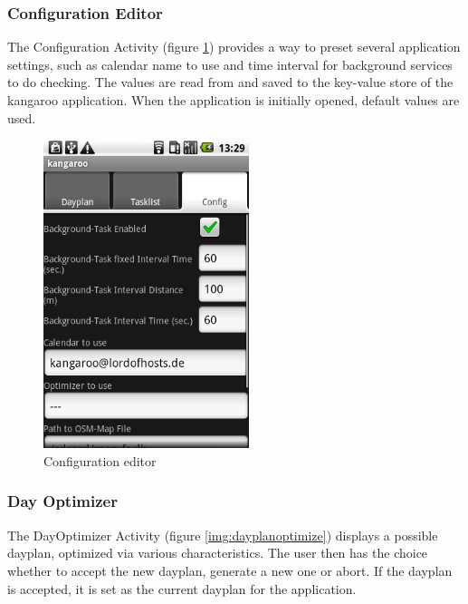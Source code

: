 
\subsubsection{Configuration Editor} %
\label{ssub:ConfigurationEditor}
The Configuration Activity (figure \ref{img:config}) provides a way to preset several
application
settings, such as calendar name to use and time interval for background
services to do checking. The values are read from and saved to the key-value store
of the kangaroo application. When the application is initially opened, default values
are used.

\begin{figure}[h!]
    \centering
    \includegraphics[width=6cm]{pics/gui/config.png}
    \caption{Configuration editor}
    \label{img:config}
\end{figure}


\subsubsection{Day Optimizer} %
\label{ssub:DayOptimizer}
The DayOptimizer Activity (figure \ref{img:dayplanoptimize}) displays a possible
dayplan, optimized via various
characteristics. The user then has the choice whether to accept the new
dayplan, generate a new one or abort. If the dayplan is accepted, it is set
as the current dayplan for the application.

